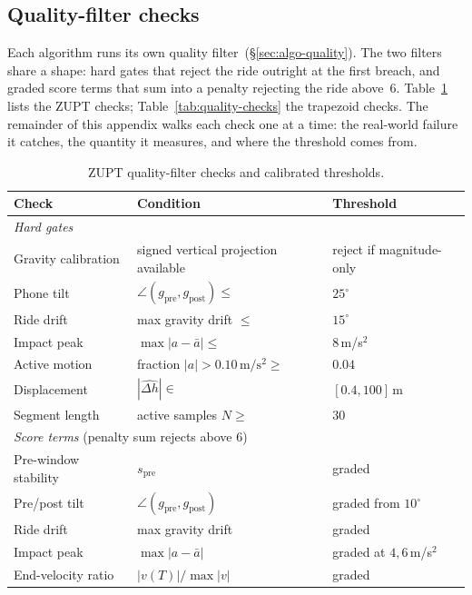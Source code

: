 \documentclass[manuscript,review,screen]{acmart}
\begin{document}
\subsection{Quality-filter checks}
\label{app:pred-quality}

Each algorithm runs its own quality
filter~(\S\ref{sec:algo-quality}).  The two filters share a shape:
hard gates that reject the ride outright at the first breach, and
graded score terms that sum into a penalty rejecting the ride
above~$6$.  Table~\ref{tab:quality-checks-zupt} lists the ZUPT checks;
Table~\ref{tab:quality-checks} the trapezoid checks.  The remainder of
this appendix walks each check one at a time: the real-world failure
it catches, the quantity it measures, and where the threshold comes
from.

\begin{table}[ht]
\centering
\small
\begin{tabular}{lll}
\toprule
\textbf{Check} & \textbf{Condition} & \textbf{Threshold} \\
\midrule
\multicolumn{3}{l}{\emph{Hard gates}}\\
Gravity calibration  & signed vertical projection available & reject if magnitude-only \\
Phone tilt           & $\angle(g_{\mathrm{pre}},g_{\mathrm{post}})\le$ & $25^{\circ}$ \\
Ride drift           & max gravity drift $\le$ & $15^{\circ}$ \\
Impact peak          & $\max|a-\bar a|\le$ & $8$\,m/s$^{2}$ \\
Active motion        & fraction $|a|>0.10\,\mathrm{m/s^2}\ge$ & $0.04$ \\
Displacement         & $|\widehat{\Delta h}|\in$ & $[0.4,100]$\,m \\
Segment length       & active samples $N\ge$ & $30$ \\
\midrule
\multicolumn{3}{l}{\emph{Score terms} (penalty sum rejects above $6$)}\\
Pre-window stability & $s_{\mathrm{pre}}$ & graded \\
Pre/post tilt        & $\angle(g_{\mathrm{pre}},g_{\mathrm{post}})$ & graded from $10^{\circ}$ \\
Ride drift           & max gravity drift & graded \\
Impact peak          & $\max|a-\bar a|$ & graded at $4,6$\,m/s$^{2}$ \\
End-velocity ratio   & $|v(T)|/\max|v|$ & graded \\
\bottomrule
\end{tabular}
\caption{ZUPT quality-filter checks and calibrated thresholds.}
\label{tab:quality-checks-zupt}
\end{table}
\end{document}
